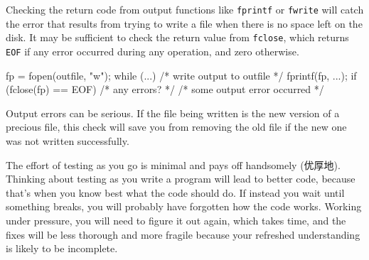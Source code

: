 Checking the return code from output functions like \verb'fprintf' or
\verb'fwrite' will catch the error that results from trying to write a file
when there is no space left on the disk.  It may be sufficient to check the
return value from \verb'fclose', which returns \verb'EOF' if any error
occurred during any operation, and zero otherwise.
\begin{wellcode}
    fp = fopen(outfile, "w");
    while (...)                 /* write output to outfile */
        fprintf(fp, ...);
    if (fclose(fp) == EOF) {    /* any errors? */
        /* some output error occurred */
    }
\end{wellcode}
Output errors can be serious. If the file being written is the new version
of a precious file, this check will save you from removing the old file if
the new one was not written successfully.

The effort of testing as you go is minimal and pays off handsomely
(优厚地).  Thinking about testing as you write a program will lead to
better code, because that's when you know best what the code should do. If
instead you wait until something breaks, you will probably have forgotten
how the code works. Working under pressure, you will need to figure it out
again, which takes time, and the fixes will be less thorough and more
fragile because your refreshed understanding is likely to be incomplete.


